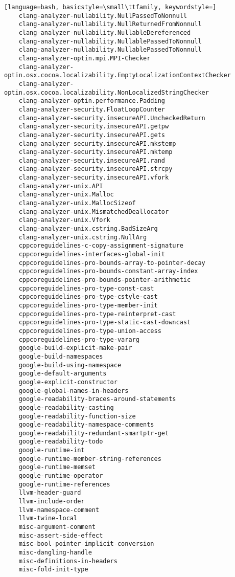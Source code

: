 \documentclass[aspectratio=169]{beamer}
\begin{document}
\begin{lstlisting}[language=bash, basicstyle=\small\ttfamily, keywordstyle=]
    clang-analyzer-nullability.NullPassedToNonnull
    clang-analyzer-nullability.NullReturnedFromNonnull
    clang-analyzer-nullability.NullableDereferenced
    clang-analyzer-nullability.NullablePassedToNonnull
    clang-analyzer-nullability.NullablePassedToNonnull
    clang-analyzer-optin.mpi.MPI-Checker
    clang-analyzer-optin.osx.cocoa.localizability.EmptyLocalizationContextChecker
    clang-analyzer-optin.osx.cocoa.localizability.NonLocalizedStringChecker
    clang-analyzer-optin.performance.Padding
    clang-analyzer-security.FloatLoopCounter
    clang-analyzer-security.insecureAPI.UncheckedReturn
    clang-analyzer-security.insecureAPI.getpw
    clang-analyzer-security.insecureAPI.gets
    clang-analyzer-security.insecureAPI.mkstemp
    clang-analyzer-security.insecureAPI.mktemp
    clang-analyzer-security.insecureAPI.rand
    clang-analyzer-security.insecureAPI.strcpy
    clang-analyzer-security.insecureAPI.vfork
    clang-analyzer-unix.API
    clang-analyzer-unix.Malloc
    clang-analyzer-unix.MallocSizeof
    clang-analyzer-unix.MismatchedDeallocator
    clang-analyzer-unix.Vfork
    clang-analyzer-unix.cstring.BadSizeArg
    clang-analyzer-unix.cstring.NullArg
    cppcoreguidelines-c-copy-assignment-signature
    cppcoreguidelines-interfaces-global-init
    cppcoreguidelines-pro-bounds-array-to-pointer-decay
    cppcoreguidelines-pro-bounds-constant-array-index
    cppcoreguidelines-pro-bounds-pointer-arithmetic
    cppcoreguidelines-pro-type-const-cast
    cppcoreguidelines-pro-type-cstyle-cast
    cppcoreguidelines-pro-type-member-init
    cppcoreguidelines-pro-type-reinterpret-cast
    cppcoreguidelines-pro-type-static-cast-downcast
    cppcoreguidelines-pro-type-union-access
    cppcoreguidelines-pro-type-vararg
    google-build-explicit-make-pair
    google-build-namespaces
    google-build-using-namespace
    google-default-arguments
    google-explicit-constructor
    google-global-names-in-headers
    google-readability-braces-around-statements
    google-readability-casting
    google-readability-function-size
    google-readability-namespace-comments
    google-readability-redundant-smartptr-get
    google-readability-todo
    google-runtime-int
    google-runtime-member-string-references
    google-runtime-memset
    google-runtime-operator
    google-runtime-references
    llvm-header-guard
    llvm-include-order
    llvm-namespace-comment
    llvm-twine-local
    misc-argument-comment
    misc-assert-side-effect
    misc-bool-pointer-implicit-conversion
    misc-dangling-handle
    misc-definitions-in-headers
    misc-fold-init-type

\end{lstlisting}
\end{document}
